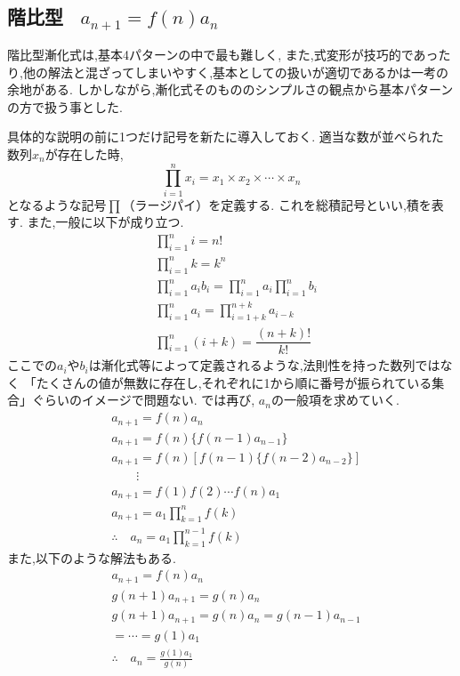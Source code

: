 
  \subsection{\texorpdfstring{階比型 \, $a_{n+1}=f(n)a_n$}{階比型}}\label{節：階比型}
    階比型漸化式は,基本4パターンの中で最も難しく,
    また,式変形が技巧的であったり,他の解法と混ざってしまいやすく,基本としての扱いが適切であるかは一考の余地がある.
    しかしながら,漸化式そのもののシンプルさの観点から基本パターンの方で扱う事とした.
    
    具体的な説明の前に1つだけ記号を新たに導入しておく.
    適当な数が並べられた数列$x_n$が存在した時,
    \[
      \prod_{i=1}^n x_i
      =x_1\times x_2\times\cdots\times x_n
    \]
    となるような記号$\prod$（ラージパイ）を定義する.
    これを総積記号といい,積を表す.
    また,一般に以下が成り立つ.
    \begin{align*}
      &\prod_{i=1}^{n}i=n!\\
      &\prod_{i=1}^{n}k=k^n\\
      &\prod_{i=1}^{n}a_ib_i=\displaystyle\prod_{i=1}^na_i\displaystyle\prod_{i=1}^nb_i\\
      &\prod_{i=1}^{n}a_i=\displaystyle\prod_{i=1+k}^{n+k}a_{i-k}\\
      &\prod_{i=1}^{n}(i+k)=\dfrac{(n+k)!}{k!}
    \end{align*}
    ここでの$a_i$や$b_i$は漸化式等によって定義されるような,法則性を持った数列ではなく
    「たくさんの値が無数に存在し,それぞれに1から順に番号が振られている集合」ぐらいのイメージで問題ない.
    では再び, $a_n$の一般項を求めていく.
    \begin{align*}
      &a_{n+1}=f(n)a_n\\
      &a_{n+1}=f(n)\{f(n-1)a_{n-1}\}\\
      &a_{n+1}=f(n)\left[f(n-1)\{f(n-2)a_{n-2}\}\right]\\
      &\qquad \vdots\\
      &a_{n+1}=f(1)f(2) \cdots f(n)a_1\\
      &a_{n+1}=a_1 \prod_{k=1}^n f(k)\\
      &\therefore \quad a_n=a_1 \prod_{k=1}^{n-1} f(k)
    \end{align*}
    また,以下のような解法もある.
    \begin{align*}
      &a_{n+1}=f(n)a_n\\
      &g(n+1)a_{n+1}=g(n)a_n\\
      &g(n+1)a_{n+1}=g(n)a_n=g(n-1)a_{n-1}\\
      &=\cdots=g(1)a_1\\
      &\therefore \quad a_n=\frac{g(1)a_1}{g(n)}
    \end{align*}
